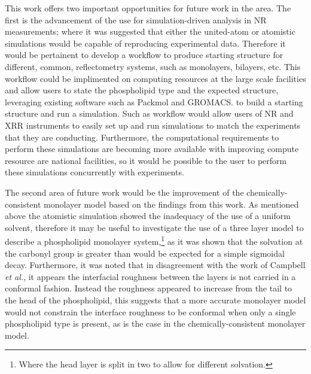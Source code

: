 This work offers two important opportunities for future work in the area.
The first is the advancement of the use for simulation-driven analysis in NR measurements; where it was suggested that either the united-atom or atomistic simulations would be capable of reproducing experimental data.
Therefore it would be pertainent to develop a workflow to produce starting structure for different, common, reflectometry systems, such as monolayers, bilayers, etc.
This workflow could be implimented on computing resources at the large scale facilities and allow users to state the phospholipid type and the expected structure, leveraging existing software such as Packmol and GROMACS.\autocite[in a similar fashion the building of a monolayer in this work]{martinez_packmol_2009,lindahl_gromacs_2001} to build a starting structure and run a simulation.
Such as workflow would allow users of NR and XRR instruments to easily set up and run simulations to match the experiments that they are conducting.
Furthermore, the computational requirements to perform these simulations are becoming more available with improving compute resource are national facilities, so it would be possible to the user to perform these simulations concurrently with experiments.

The second area of future work would be the improvement of the chemically-consistent monolayer model based on the findings from this work.
As mentioned above the atomistic simulation showed the inadequacy of the use of a uniform solvent, therefore it may be useful to investigate the use of a three layer model to describe a phospholipid monolayer system,\footnote{Where the head layer is split in two to allow for different solvation.} as it was shown that the solvation at the carbonyl group is greater than would be expected for a simple sigmoidal decay.
Furthermore, it was noted that in disagreement with the work of Campbell \emph{et al.},\autocite{campbell_structure_2018} it appears the interfacial roughness between the layers is not carried in a conformal fashion.
Instead the roughness appeared to increase from the tail to the head of the phospholipid, this suggests that a more accurate monolayer model would not constrain the interface roughness to be conformal when only a single phospholipid type is present, as is the case in the chemically-consistent monolayer model.

